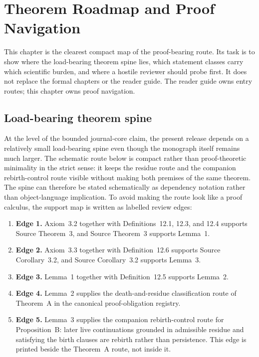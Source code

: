 \section{Theorem Roadmap and Proof Navigation}
\label{sec:oc13-theorem-roadmap}

This chapter is the clearest compact map of the proof-bearing route. Its task is
to show where the load-bearing theorem spine lies, which statement classes carry
which scientific burden, and where a hostile reviewer should probe first. It
does not replace the formal chapters or the reader guide. The reader guide owns
entry routes; this chapter owns proof navigation.

\subsection{Load-bearing theorem spine}

At the level of the bounded journal-core claim, the present release depends on
a relatively small load-bearing spine even though the monograph itself remains
much larger. The schematic route below is compact rather than proof-theoretic
minimality in the strict sense: it keeps the residue route and the companion
rebirth-control route visible without making both premises of the same theorem.
The spine can therefore be stated schematically as
dependency notation rather than object-language implication. To avoid making
the route look like a proof calculus, the support map is written as labelled
review edges:

\begin{enumerate}
\item \textbf{Edge 1.} Axiom~3.2 together with Definitions~12.1, 12.3, and
      12.4 supports Source Theorem~3, and Source Theorem~3 supports Lemma~1.
\item \textbf{Edge 2.} Axiom~3.3 together with Definition~12.6 supports
      Source Corollary~3.2, and Source Corollary~3.2 supports Lemma~3.
\item \textbf{Edge 3.} Lemma~1 together with Definition~12.5 supports
      Lemma~2.
\item \textbf{Edge 4.} Lemma~2 supplies the death-and-residue classification
      route of Theorem~A in the canonical proof-obligation registry.
\item \textbf{Edge 5.} Lemma~3 supplies the companion rebirth-control route
      for Proposition~B: later live continuations grounded in admissible
      residue and satisfying the birth clauses are rebirth rather than
      persistence. This edge is printed beside the Theorem~A route, not inside
      it.
\end{enumerate}

